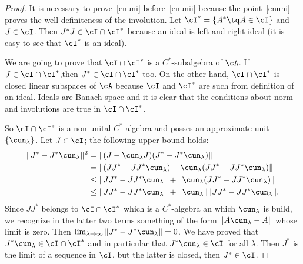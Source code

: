 \begin{proof}
	It is necessary to prove~\ref{enuni} before~\ref{enunii} because the point~\ref{enuni} proves the well definiteness of the involution. Let $\cI^*=\{ A^*\tq A\in\cI \}$ and $J\in\cI$. Then $J^*J\in\cI\cap\cI^*$ because an ideal is left and right ideal (it is easy to see that $\cI^*$ is an ideal).

	We are going to prove that $\cI\cap\cI^*$ is a $C^*$-subalgebra of $\cA$. If $J\in \cI\cap\cI^*$,then $J^*\in \cI\cap\cI^*$ too. On the other hand, $\cI\cap\cI^*$ is closed linear subspaces of $\cA$ because $\cI$ and $\cI^*$ are such from definition of an ideal. Ideals are Banach space and it is clear that the conditions about norm and involutions are true in $\cI\cap\cI^*$.

	So $\cI\cap\cI^*$ is a non unital $C^*$-algebra and posses an approximate unit $\{ \cun_{\lambda} \}$. Let $J\in\cI$; the following upper bound holds:
	\begin{equation}
		\begin{split}
			\| J^*-J^*\cun_{\lambda} \|^2&=\| (J-\cun_{\lambda}J)(J^*-J^*\cun_{\lambda}) \|\\
			&=\| (JJ^*-JJ^*\cun_{\lambda})-\cun_{\lambda}(JJ^*-JJ^*\cun_{\lambda}) \|\\
			&\leq \| JJ^*-JJ^*\cun_{\lambda} \|+\| \cun_{\lambda}(JJ^*-JJ^*\cun_{\lambda}) \|\\
			&\leq \| JJ^*-JJ^*\cun_{\lambda} \|+\| \cun_{\lambda} \|\| JJ^*-JJ^*\cun_{\lambda} \|.
		\end{split}
	\end{equation}
	Since $JJ^*$ belongs to $\cI\cap\cI^*$ which is a $C^*$-algebra an which $\cun_{\lambda}$ is build, we recognize in the latter two terms something of the form $\| A\cun_{\lambda}-A \|$ whose limit is zero. Then $\lim_{\lambda\to\infty}\| J^*-J^*\cun_{\lambda} \|=0$.
	We have proved that $J^*\cun_{\lambda}\in\cI\cap\cI^*$ and in particular that $J^*\cun_{\lambda}\in\cI$ for all $\lambda$. Then $J^*$ is the limit of a sequence in $\cI$, but the latter is closed, then $J^*\in\cI$.


\end{proof}
